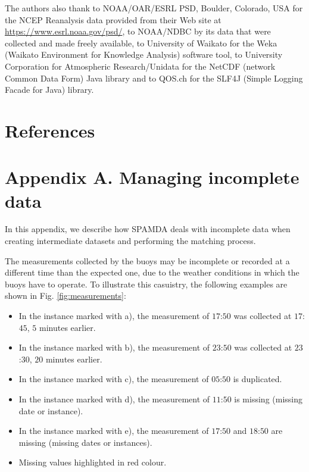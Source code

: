 \documentclass[review]{elsarticle}
\begin{document}
		The authors also thank to NOAA/OAR/ESRL PSD, Boulder, Colorado, USA for the NCEP Reanalysis data provided from their Web site at \url{https://www.esrl.noaa.gov/psd/}, to NOAA/NDBC by its data that were collected and made freely available, to University of Waikato for the Weka (Waikato Environment for Knowledge Analysis) software tool, to University Corporation for Atmospheric Research/Unidata for the NetCDF (network Common Data Form) Java library and to QOS.ch for the SLF4J (Simple Logging Facade for Java) library.
		
	\section*{References}

		

	
	\section*{Appendix A. Managing incomplete data}\label{app:AppendixA}
	
		In this appendix, we describe how SPAMDA deals with incomplete data when creating intermediate datasets and performing the matching process.
		
		The measurements collected by the buoys may be incomplete or recorded at a different time than the expected one, due to the weather conditions in which the buoys have to operate. To illustrate this casuistry, the following examples are shown in Fig. \ref{fig:measurements}:		
		\begin{itemize}
			\item In the instance marked with a), the measurement of $17$:$50$ was collected at $17$:$45$, $5$ minutes earlier.
			\item In the instance marked with b), the measurement of $23$:$50$ was collected at $23$:$30$, $20$ minutes earlier.
			\item In the instance marked with c), the measurement of $05$:$50$ is duplicated.
			\item In the instance marked with d), the measurement of $11$:$50$ is missing (missing date or instance).
			\item In the instance marked with e), the measurement of $17$:$50$ and $18$:$50$ are missing (missing dates or instances).
			\item Missing values highlighted in red colour.
		\end{itemize}
		
\end{document}
